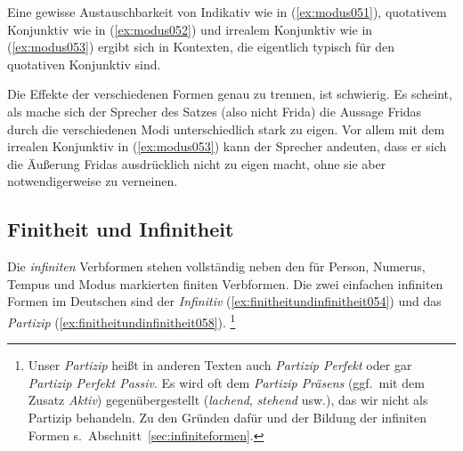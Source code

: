 

Eine gewisse Austauschbarkeit von Indikativ wie in (\ref{ex:modus051}), quotativem Konjunktiv wie in (\ref{ex:modus052}) und irrealem Konjunktiv wie in (\ref{ex:modus053}) ergibt sich in Kontexten, die eigentlich typisch für den quotativen Konjunktiv sind.

\begin{exe}
  \ex\label{ex:modus050}
  \begin{xlist}
  \end{xlist}
\end{exe}

Die Effekte der verschiedenen Formen genau zu trennen, ist schwierig.
Es scheint, als mache sich der Sprecher des Satzes (also nicht Frida) die Aussage Fridas durch die verschiedenen Modi unterschiedlich stark zu eigen.
Vor allem mit dem irrealen Konjunktiv in (\ref{ex:modus053}) kann der Sprecher andeuten, dass er sich die Äußerung Fridas ausdrücklich nicht zu eigen macht, ohne sie aber notwendigerweise zu verneinen.

\subsection{Finitheit und Infinitheit}
\label{sec:finitheitundinfinitheit}


Die \textit{infiniten} Verbformen stehen vollständig neben den für Person, Numerus, Tempus und Modus markierten finiten Verbformen.
Die zwei einfachen infiniten Formen im Deutschen sind der \textit{Infinitiv} (\ref{ex:finitheitundinfinitheit054}) und das \textit{Partizip} (\ref{ex:finitheitundinfinitheit058}).%
\footnote{Unser \textit{Partizip} heißt in anderen Texten auch \textit{Partizip Perfekt} oder gar \textit{Partizip Perfekt Passiv}.
Es wird oft dem \textit{Partizip Präsens} (ggf.\ mit dem Zusatz \textit{Aktiv}) gegenübergestellt (\textit{lachend}, \textit{stehend} usw.), das wir nicht als Partizip behandeln.
Zu den Gründen dafür und der Bildung der infiniten Formen s.\ Abschnitt~\ref{sec:infiniteformen}.}

